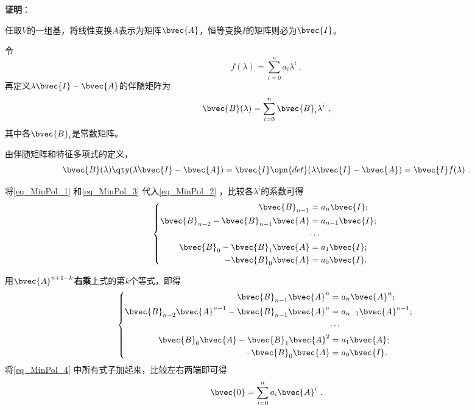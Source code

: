 \textbf{证明}：

任取$V$的一组基，将线性变换$A$表示为矩阵$\bvec{A}$，恒等变换$I$的矩阵则必为$\bvec{I}$。

令
\begin{equation}\label{eq_MinPol_1}
f(\lambda) = \sum_{i=0}^n a_i\lambda^i~, 
\end{equation}
再定义$\lambda\bvec{I}-\bvec{A}$的伴随矩阵为
\begin{equation}\label{eq_MinPol_3}
\bvec{B}(\lambda)=\sum_{i=0}^n \bvec{B}_i\lambda^i~, 
\end{equation}
其中各$\bvec{B}_i$是常数矩阵。

由伴随矩阵和特征多项式的定义，
\begin{equation}\label{eq_MinPol_2}
\bvec{B}(\lambda)\qty(\lambda\bvec{I}-\bvec{A}) = \bvec{I}\opn{det}(\lambda\bvec{I}-\bvec{A}) = \bvec{I}f(\lambda)~. 
\end{equation}

将\autoref{eq_MinPol_1} 和\autoref{eq_MinPol_3} 代入\autoref{eq_MinPol_2} ，比较各$\lambda^i$的系数可得
\begin{equation}
\left\{
\begin{aligned}
\bvec{B}_{n-1} ={}& a_n\bvec{I}; \\
\bvec{B}_{n-2}-\bvec{B}_{n-1}\bvec{A} ={}& a_{n-1}\bvec{I}; \\
\cdots{}&\\
\bvec{B}_{0}-\bvec{B}_{1}\bvec{A} ={}& a_1\bvec{I};\\
-\bvec{B}_{0}\bvec{A} ={}& a_0\bvec{I}. 
\end{aligned}
\right. ~
\end{equation}

用$\bvec{A}^{n+1-k}$\textbf{右乘}上式的第$k$个等式，即得
\begin{equation}\label{eq_MinPol_4}
\left\{
\begin{aligned}
\bvec{B}_{n-1} \bvec{A}^n={}& a_n\bvec{A}^n; \\
\bvec{B}_{n-2}\bvec{A}^{n-1}-\bvec{B}_{n-1}\bvec{A}^n ={}& a_{n-1}\bvec{A}^{n-1}; \\
\cdots{}&\\
\bvec{B}_{0}\bvec{A}-\bvec{B}_{1}\bvec{A}^2 ={}& a_1\bvec{A};\\
-\bvec{B}_{0}\bvec{A} ={}& a_0\bvec{I}. 
\end{aligned}
\right. ~
\end{equation}
将\autoref{eq_MinPol_4} 中所有式子加起来，比较左右两端即可得
\begin{equation}
\bvec{0} = \sum_{i=0}^n a_i\bvec{A}^i~. 
\end{equation}

